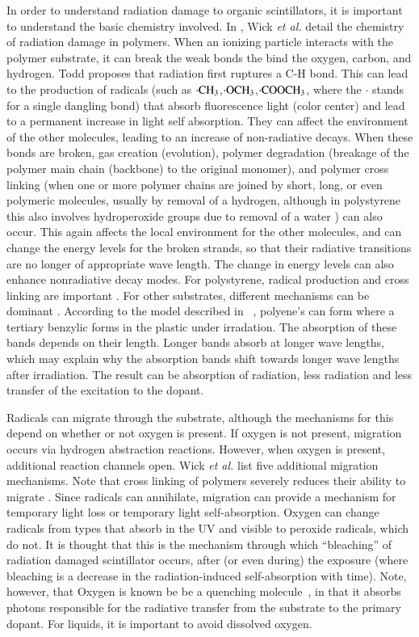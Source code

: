In order to understand radiation damage to organic scintillators, it is important to
understand the basic chemistry involved.
In \cite{Wulkop1995141}, Wick {\it{et al.}} detail
the chemistry of radiation damage in polymers. 
When an ionizing particle interacts with the polymer substrate, it can
break the weak bonds the bind the oxygen, carbon, and hydrogen.
Todd\cite{todd} proposes that radiation first ruptures a C-H bond.
This can lead to the production
of radicals (such as  ${\rm \cdot CH_3}$,${\rm \cdot OCH_3}$,${\rm \cdot COOCH_3}$, where the $\cdot$ stands for a single dangling bond)
that absorb fluorescence light (color center) and lead to 
a permanent increase in light self absorption.
They can affect the environment of the other molecules, leading to
an increase of non-radiative decays.
When these bonds are broken, gas creation (evolution), polymer degradation (breakage 
of the polymer main chain (backbone) to the original monomer), 
and polymer cross linking
(when one or more polymer chains are joined by short, long, or even
polymeric molecules, usually by removal of a hydrogen,
although in polystyrene this also involves hydroperoxide groups due to removal of a water \cite{todd})
can also occur\cite{Wick1991472}.  
This again affects the local environment for the other molecules, and
can
change the energy levels for the broken strands, so that their
radiative transitions are no longer of appropriate wave length.
The change in energy levels can also enhance nonradiative decay modes.
For polystyrene, radical production and cross linking
are important \cite{Wick1991472}.  For other substrates, different
mechanisms can be dominant \cite{Wick1991472}.
According to the model described in ~\cite{kauffman}, polyene's
can form where a tertiary benzylic forms in the plastic under irradation.
The absorption of these bands depends on their length.  Longer bands
absorb at longer wave lengths, which may explain why the absorption bands
shift towards longer wave lengths after irradiation.
The result can be absorption of radiation,
less radiation and less transfer of the
excitation to the dopant.


Radicals
can migrate through the substrate, although the mechanisms for this
depend on whether or not oxygen is present.  If oxygen
is not present, migration occurs via hydrogen abstraction reactions.
However, when oxygen is present, additional reaction channels open.
Wick {\it{et al.}} list five additional migration mechanisms.
Note that cross linking of polymers severely reduces their
ability to migrate \cite{weir}.
Since radicals can
annihilate, migration can provide  a mechanism for
temporary light loss or temporary light self-absorption.   
Oxygen can change radicals
from types that absorb in the UV and visible to peroxide radicals,
which do not.  It is thought that this is the mechanism
through which ``bleaching'' of radiation damaged scintillator
occurs, after (or even during) the exposure (where bleaching
is a decrease in the radiation-induced self-absorption with time).
Note, however, that Oxygen is known be be a quenching molecule~\cite{sauli}, 
in that it absorbs photons responsible for the radiative transfer
from the substrate to the primary dopant.  For liquids, it is important
to avoid dissolved oxygen.

